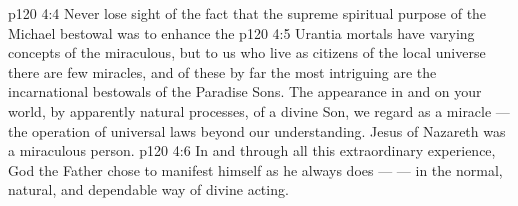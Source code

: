\vs p120 4:4 Never lose sight of the fact that the supreme spiritual purpose of the Michael bestowal was to enhance the 
\vs p120 4:5 \pc Urantia mortals have varying concepts of the miraculous, but to us who live as citizens of the local universe there are few miracles, and of these by far the most intriguing are the incarnational bestowals of the Paradise Sons. The appearance in and on your world, by apparently natural processes, of a divine Son, we regard as a miracle --- the operation of universal laws beyond our understanding. Jesus of Nazareth was a miraculous person.
\vs p120 4:6 In and through all this extraordinary experience, God the Father chose to manifest himself as he always does ---  --- in the normal, natural, and dependable way of divine acting.
\quizlink
